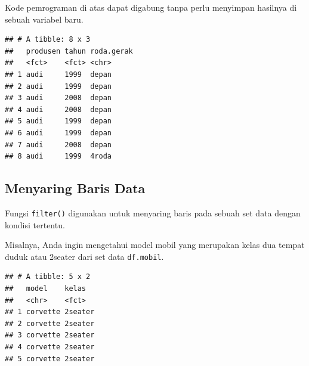 \documentclass[openany]{book}
\newenvironment{Shaded}{\begin{snugshade}}{\end{snugshade}}
\newcommand{\KeywordTok}[1]{\textcolor[rgb]{0.13,0.29,0.53}{\textbf{#1}}}
\newcommand{\DecValTok}[1]{\textcolor[rgb]{0.00,0.00,0.81}{#1}}
\newcommand{\StringTok}[1]{\textcolor[rgb]{0.31,0.60,0.02}{#1}}
\newcommand{\CommentTok}[1]{\textcolor[rgb]{0.56,0.35,0.01}{\textit{#1}}}
\newcommand{\OperatorTok}[1]{\textcolor[rgb]{0.81,0.36,0.00}{\textbf{#1}}}
\newcommand{\NormalTok}[1]{#1}
\begin{document}
Kode pemrograman di atas dapat digabung tanpa perlu menyimpan hasilnya
di sebuah variabel baru.

\begin{Shaded}
\end{Shaded}

\begin{verbatim}
## # A tibble: 8 x 3
##   produsen tahun roda.gerak
##   <fct>    <fct> <chr>     
## 1 audi     1999  depan     
## 2 audi     1999  depan     
## 3 audi     2008  depan     
## 4 audi     2008  depan     
## 5 audi     1999  depan     
## 6 audi     1999  depan     
## 7 audi     2008  depan     
## 8 audi     1999  4roda
\end{verbatim}

\subsection{Menyaring Baris Data}\label{menyaring-baris-data}

Fungsi \texttt{filter()} digunakan untuk menyaring baris pada sebuah set
data dengan kondisi tertentu.

Misalnya, Anda ingin mengetahui model mobil yang merupakan kelas dua
tempat duduk atau 2seater dari set data \texttt{df.mobil}.

\begin{Shaded}
\end{Shaded}

\begin{verbatim}
## # A tibble: 5 x 2
##   model    kelas  
##   <chr>    <fct>  
## 1 corvette 2seater
## 2 corvette 2seater
## 3 corvette 2seater
## 4 corvette 2seater
## 5 corvette 2seater
\end{verbatim}
\end{document}
